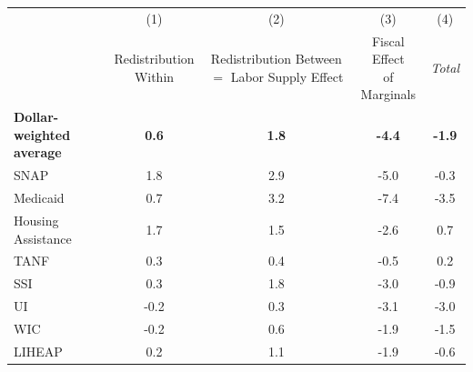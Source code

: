 \begin{tabular*}{1.38\textwidth}{@{\extracolsep{\fill}}lcccc}
  \toprule
  \addlinespace
\multicolumn{1}{c}{} & (1)                   & (2)
& (3)                      & (4)  \\
                     & \shortstack{Redistribution \\ Within} &
\shortstack{Redistribution Between \\ $=$ Labor Supply Effect} & \shortstack{Fiscal Effect \\ of
  Marginals} & \textit{Total} \\
\cline{2-5} 
\textbf{Dollar-weighted average} & \textbf{0.6}        & \textbf{1.8}         & \textbf{-4.4}             & \textbf{-1.9}  \\

\addlinespace

SNAP                 & 1.8        & 2.9         & -5.0             & -0.3 \\
Medicaid             & 0.7        & 3.2         & -7.4             & -3.5 \\
Housing Assistance   & 1.7        & 1.5         & -2.6             & 0.7 \\
TANF                 & 0.3        & 0.4         & -0.5             & 0.2 \\
SSI                  & 0.3        & 1.8         & -3.0             & -0.9 \\
UI                   & -0.2        & 0.3         & -3.1             & -3.0 \\
WIC                  & -0.2        & 0.6         & -1.9             & -1.5 \\
LIHEAP               & 0.2
& 1.1         & -1.9
& -0.6 \\
\bottomrule 
\end{tabular*}
